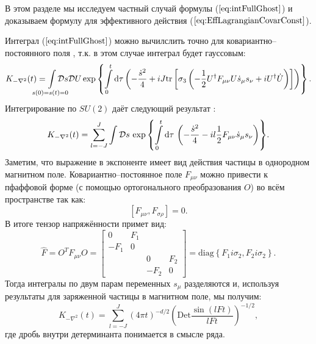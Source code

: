 
В этом разделе мы исследуем частный случай формулы ($\ref{eq:intFullGhost}$) и доказываем формулу для эффективного действия ($\ref{eq:EffLagrangianCovarConst}$).

Интеграл ($\ref{eq:intFullGhost}$) можно вычилслить точно для ковариантно--постоянного поля \cite{Mnev}, т.к. в этом случае интеграл будет гауссовым:
\begin{equation*}
	K_{-\nabla^2}(t)=\mkern-6\thickmuskip\int\limits_{s(0)=s(t)=0} \mkern-6\thickmuskip\mathcal{D}s\mathcal{D}U \exp\left\{ \int\limits_0^t \D \tau \left(-\frac{\dot{s}^2}{4} + iJ\tr\left[\sigma_3\left( -\frac12 U^\dagger F_{\mu\nu}U \dot{s}_\mu s_\nu + iU^\dagger \dot{U}\right)\right] \right)\right\}.
\end{equation*}
Интегрирование по $SU(2)$ даёт следующий результат \cite{Mnev}:
\begin{equation*}
	K_{-\nabla^2}(t)=\sum\limits_{l=-J}^J\int\mathcal{D}s\, \exp{\left\{ \int\limits_0^t \mathrm{d}\tau \, \left(-\frac{\dot{s}^2}{4} - il\frac12 F_{\mu \nu}\dot{s}_\mu s_\nu \right)\right\}}.
\end{equation*}
Заметим, что выражение в экспоненте имеет вид действия частицы в однородном магнитном поле. Ковариантно--постоянное поле $F_{\mu \nu}$ можно привести к пфаффовой форме (с помощью ортогонального преобразования $O$) во всём пространстве так как:
\begin{equation}
	\label{eq:Commutator}
	\left[F_{\mu \nu},F_{\sigma \rho}\right]=0.
\end{equation}
В итоге тензор напряжённости примет вид:
\begin{equation}
	\label{eq:FPffaf}
	\hat{F}=O^{T}F_{\mu \nu}O=
	\begin{bmatrix}
		0 & F_1 & & \\
		-F_1 & 0 & &\\
		& & 0 & F_2\\
		& & -F_2 & 0
	\end{bmatrix}=
	\mathrm{diag}\left\{F_1 i\sigma_2,F_2 i\sigma_2\right\}.
\end{equation}
Тогда интегралы по двум парам переменных $s_\mu$ разделяются и, используя результаты для заряженной частицы в магнитном поле, мы получим:
\begin{equation}
	\label{eq:HeatKernelCovarConstResult}
	K_{-\nabla^2}(t)=\sum\limits_{l=-J}^J (4\pi t)^{-d/2} \left(\mathrm{Det}\frac{\sin{\left(l F t\right)}}{l F t}\right)^{-1/2},
\end{equation}
где дробь внутри детерминанта понимается в смысле ряда.
